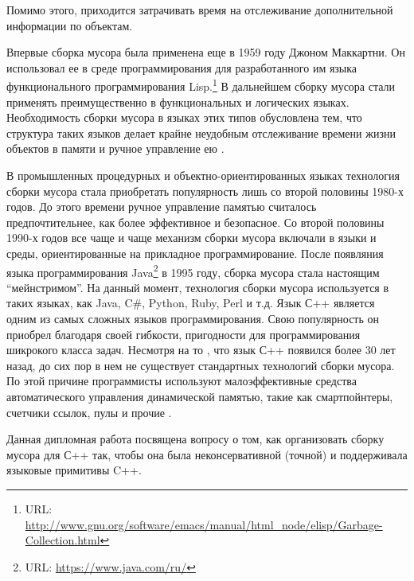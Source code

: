 \pagebreak

Помимо этого, приходится затрачивать время на отслеживание дополнительной информации по объектам.
 
Впервые сборка мусора была применена еще  в 1959 году Джоном Маккартни. Он использовал ее в среде программирования для разработанного им языка функционального программирования Lisp.\footnote{URL:   \url{http://www.gnu.org/software/emacs/manual/html_node/elisp/Garbage-Collection.html}} В дальнейшем сборку мусора стали применять преимущественно в функциональных и логических языках. Необходимость сборки мусора в языках этих типов обусловлена тем, что структура таких языков делает крайне неудобным отслеживание времени жизни объектов в памяти и ручное управление ею .
 
В промышленных процедурных и объектно-ориентированных языках технология сборки мусора стала приобретать популярность лишь со второй половины 1980-х годов. До этого времени ручное управление памятью считалось предпочтительнее, как более эффективное и безопасное. Со второй половины 1990-х годов все чаще и чаще механизм сборки мусора включали в языки и среды, ориентированные на прикладное программирование. После появляния языка программирования Java\footnote{URL: \url{https://www.java.com/ru/}} в 1995 году, сборка мусора стала настоящим “мейнстримом”.  На данный момент, технология сборки мусора используется в таких языках, как Java, C\#, Python, Ruby, Perl и т.д.
Язык С++ является одним из самых сложных языков программирования. Свою популярность он приобрел благодаря своей гибкости, пригодности для программирования шикрокого класса задач. Несмотря на то , что язык С++ появился более 30 лет назад, до сих пор в нем не существует стандартных  технологий сборки мусора. По этой причине программисты используют  малоэффективные средства автоматического управления динамической памятью, такие как смартпойнтеры, счетчики ссылок, пулы и прочие .

Данная дипломная работа посвящена вопросу о том, как организовать сборку мусора для С++ так, чтобы она была неконсервативной (точной) и  поддерживала языковые примитивы C++.